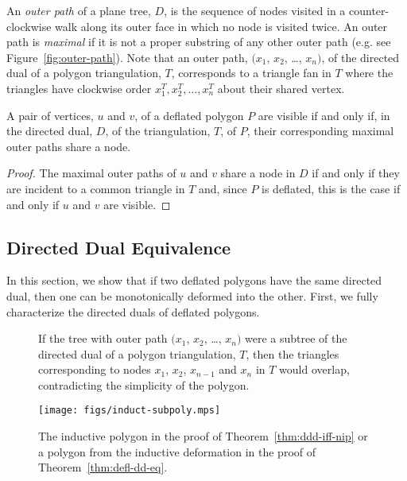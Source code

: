 \documentclass{patmorin}
\begin{document}
An \emph{outer path} of a plane tree, $D$, is the sequence of nodes
visited in a counter-clockwise walk along its outer face in which no
node is visited twice.  An outer path is \emph{maximal} if it is not a
proper substring of any other outer path (e.g. see
Figure~\ref{fig:outer-path}).  Note that an outer path, $(x_1$, $x_2$,
\ldots, $x_n)$, of the directed dual of a polygon triangulation, $T$,
corresponds to a triangle fan in $T$ where the triangles have
clockwise order $x_1^T, x_2^T, \ldots, x_n^T$ about their shared
vertex.

\begin{theorem}
  A pair of vertices, $u$ and $v$, of a deflated polygon $P$ are
  visible if and only if, in the directed dual, $D$, of the
  triangulation, $T$, of $P$, their corresponding maximal outer paths
  share a node.
\end{theorem}
\begin{proof}
  The maximal outer paths of $u$ and $v$ share a node in $D$ if and
  only if they are incident to a common triangle in $T$ and, since $P$
  is deflated, this is the case if and only if $u$ and $v$ are
  visible.
\end{proof}


\subsection{Directed Dual Equivalence}

In this section, we show that if two deflated polygons have the same
directed dual, then one can be monotonically deformed into the other.
First, we fully characterize the directed duals of deflated polygons.

\begin{figure}[htb]
  \centering {} \quad
  \caption{If \protect{} the tree with outer
    path $(x_1$, $x_2$, \ldots, $x_n)$ were a subtree of the directed
    dual of a polygon triangulation, $T$,
    then \protect{} the triangles
    corresponding to nodes $x_1$, $x_2$, $x_{n-1}$ and $x_n$ in $T$
    would overlap, contradicting the simplicity of the
    polygon.}  \label{fig:ill-path}
\end{figure}

\begin{figure}[htb]
  \centering
  \texttt{[image: figs/induct-subpoly.mps]}
  \caption{The inductive polygon in the proof of
    Theorem~\ref{thm:ddd-iff-nip} or a polygon from the inductive
    deformation in the proof of Theorem~\ref{thm:defl-dd-eq}.}
  \label{fig:no-ill-then-space}
\end{figure}
\end{document}
